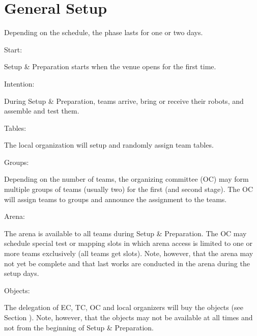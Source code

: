 \section{General Setup}
\label{sec:general_setup}
Depending on the schedule, the  phase lasts for one or two days.

\begin{enumerate}
	{\bf\item Start:} Setup \& Preparation starts when the venue opens for the first time.
	{\bf\item Intention:} During Setup \& Preparation, teams arrive, bring or receive their robots, and assemble and test them.
	{\bf\item Tables:} The local organization will setup and randomly assign team tables.
	{\bf\item Groups:} Depending on the number of teams, the organizing committee (OC) may form multiple groups of teams (usually two) for the first (and second stage). The OC will assign teams to groups and announce the assignment to the teams.
	{\bf\item Arena:} The arena is available to all teams during Setup \& Preparation. The OC may schedule special test or mapping slots in which arena access is limited to one or more teams exclusively (all teams get slots). Note, however, that the arena may not yet be complete and that last works are conducted in the arena during the setup days.
	{\bf\item Objects:} The delegation of EC, TC, OC and local organizers will buy the objects (see Section ). Note, however, that the objects may not be available at all times and not from the beginning of Setup \& Preparation.
\end{enumerate}

